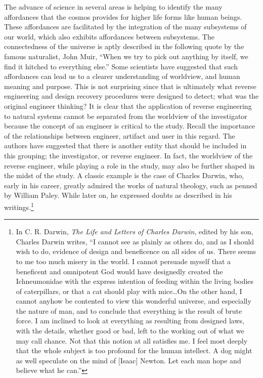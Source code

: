 The advance of science in several areas is helping to identify the many
affordances that the cosmos provides for higher life forms like human
beings.\citep{barrow2008} These affordances are facilitated by the
integration of the many subsystems of our world, which also exhibits
affordances between subsystems. The connectedness of the universe is
aptly described in the following quote by the famous naturalist, John
Muir, “When we try to pick out anything by itself, we find it hitched
to everything else.”\citep[][pg. 110]{muir1988} Some scientists have suggested
that such affordances can lead us to a clearer understanding of
worldview, and human meaning and purpose.\citep{denton1998} This is
not surprising since that is ultimately what reverse engineering and
design recovery procedures were designed to detect; what was the
original engineer thinking? It is clear that the application of reverse
engineering to natural systems cannot be separated from the worldview
of the investigator because the concept of an engineer is critical to
the study. Recall the importance of the relationships between engineer,
artifact and user in this regard. The authors have suggested that there
is another entity that should be included in this grouping; the
investigator, or reverse engineer. In fact, the worldview of the
reverse engineer, while playing a role in the study, may also be
further shaped in the midst of the study. A classic example is the case
of Charles Darwin, who, early in his career, greatly admired the works
of natural theology, such as penned by William Paley. While later on,
he expressed doubts as described in his writings.\footnote{
In C. R. Darwin, \textit{The Life and Letters of
Charles Darwin}, edited by his son, Charles Darwin writes, “I cannot see as plainly as others do,
and as I should wish to do, evidence of design and beneficence on all
sides of us. There seems to me too much misery in the world.  I cannot
persuade myself that a beneficent and omnipotent God would have
designedly created the Ichneumonidae with the express intention of
feeding within the living bodies of caterpillars, or that a cat should
play with mice…On the other hand, I cannot anyhow be contented to view
this wonderful universe, and especially the nature of man, and to
conclude that everything is the result of brute force. I am inclined to
look at everything as resulting from designed laws, with the details,
whether good or bad, left to the working out of what we may call
chance. Not that this notion at all satisfies me. I feel most deeply
that the whole subject is too profound for the human intellect. A dog
might as well speculate on the mind of [Isaac] Newton. Let each man
hope and believe what he can.”\citep{darwinll}
}

